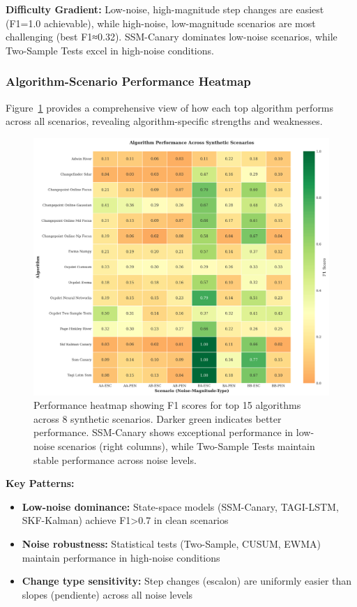 \documentclass[journal,article,submit,pdftex,moreauthors]{Definitions/mdpi}
\begin{document}
\textbf{Difficulty Gradient:} Low-noise, high-magnitude step changes are easiest (F1=1.0 achievable), while high-noise, low-magnitude scenarios are most challenging (best F1≈0.32). SSM-Canary dominates low-noise scenarios, while Two-Sample Tests excel in high-noise conditions.


\subsubsection{Algorithm-Scenario Performance Heatmap}

Figure~\ref{fig:scenario_heatmap} provides a comprehensive view of how each top algorithm performs across all scenarios, revealing algorithm-specific strengths and weaknesses.

\begin{figure}[ht]
\centering
\includegraphics[width=\textwidth]{figures/fig_scenario_heatmap.png}
\caption{Performance heatmap showing F1 scores for top 15 algorithms across 8 synthetic scenarios. Darker green indicates better performance. SSM-Canary shows exceptional performance in low-noise scenarios (right columns), while Two-Sample Tests maintain stable performance across noise levels.}
\label{fig:scenario_heatmap}
\end{figure}

\textbf{Key Patterns:} 
\begin{itemize}
\item \textbf{Low-noise dominance:} State-space models (SSM-Canary, TAGI-LSTM, SKF-Kalman) achieve F1>0.7 in clean scenarios
\item \textbf{Noise robustness:} Statistical tests (Two-Sample, CUSUM, EWMA) maintain performance in high-noise conditions
\item \textbf{Change type sensitivity:} Step changes (escalon) are uniformly easier than slopes (pendiente) across all noise levels
\end{itemize}
\end{document}
